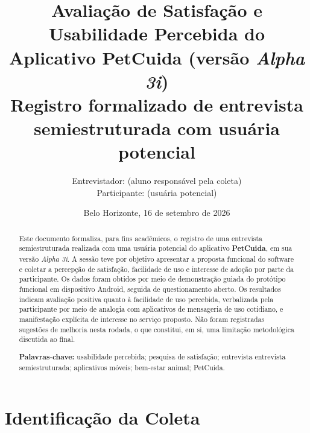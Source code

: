 \documentclass[12pt,a4paper]{article}
\title{\textbf{Avaliação de Satisfação e Usabilidade Percebida do\\
Aplicativo PetCuida (versão \textit{Alpha 3i})}\\[0.4cm]
\large Registro formalizado de entrevista semiestruturada com usuária potencial}
\author{Entrevistador: \entrevistador{} (aluno responsável pela coleta)\\
Participante: \participante{} (usuária potencial)}
\date{Belo Horizonte, 16 de setembro de 2026}
\begin{document}
\maketitle
\thispagestyle{empty}

\begin{abstract}
\noindent Este documento formaliza, para fins acadêmicos, o registro de uma entrevista
semiestruturada realizada com uma usuária potencial do aplicativo \textbf{PetCuida}, em sua
versão \textit{Alpha 3i}. A sessão teve por objetivo apresentar a proposta funcional do
software e coletar a percepção de satisfação, facilidade de uso e interesse de adoção por
parte da participante. Os dados foram obtidos por meio de demonstração guiada do protótipo
funcional em dispositivo Android, seguida de questionamento aberto. Os resultados indicam
avaliação positiva quanto à facilidade de uso percebida, verbalizada pela participante por
meio de analogia com aplicativos de mensageria de uso cotidiano, e manifestação explícita
de interesse no serviço proposto. Não foram registradas sugestões de melhoria nesta rodada,
o que constitui, em si, uma limitação metodológica discutida ao final.

\vspace{0.4cm}
\noindent\textbf{Palavras-chave:} usabilidade percebida; pesquisa de satisfação; entrevista
entrevista semiestruturada; aplicativos móveis; bem-estar animal; PetCuida.
\end{abstract}

\newpage
\tableofcontents
\newpage

\section{Identificação da Coleta}
\end{document}
